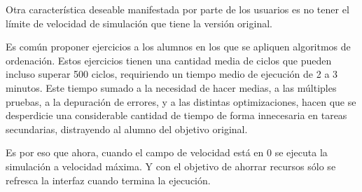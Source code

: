 Otra característica deseable manifestada por parte de los usuarios es no tener el 
límite de velocidad de simulación que tiene la versión original.

\bigskip
Es común proponer ejercicios a los alumnos en los que se apliquen algoritmos de ordenación. Estos 
ejercicios tienen una cantidad media de ciclos que pueden incluso superar 500 ciclos, requiriendo
 un tiempo medio de ejecución de 2 a 3 minutos.
Este tiempo sumado a la necesidad de hacer medias,  a las múltiples pruebas, a la depuración de errores,
 y a las distintas optimizaciones, hacen que se desperdicie una considerable cantidad de 
  tiempo de forma innecesaria en tareas secundarias, distrayendo al alumno del objetivo original.

\bigskip
Es por eso que ahora, cuando el campo de velocidad está en 0 se ejecuta la simulación a velocidad 
máxima. Y con el objetivo de ahorrar recursos sólo se refresca la interfaz cuando termina la ejecución. 